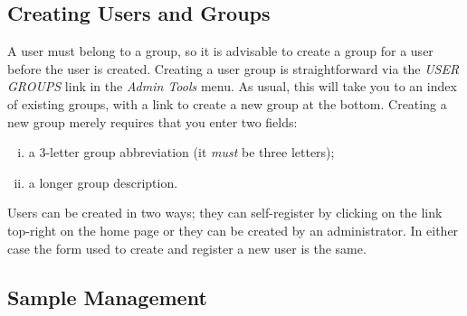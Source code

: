 \documentclass[12pt,twoside]{article}
\begin{document}
\subsection{Creating Users and Groups}
A user must belong to a group, so it is advisable to create a group for a
user before the user is created. Creating a user group is straightforward
via the \emph{USER GROUPS} link in the \emph{Admin Tools} menu.
As usual, this will take you to an index of existing groups, with a link
to create a new group at the bottom. Creating a new group merely requires
that you enter two fields:
\begin{enumerate}[(i)]
\item
a 3-letter group abbreviation (it \emph{must} be three letters);
\item
a longer group description.
\end{enumerate}

Users can be created in two ways; they can self-register by clicking
on the link top-right on the home page or they can be created by an
administrator. In either case the form used to create and register a new
user is the same.

\subsection{Sample Management}
\end{document}
